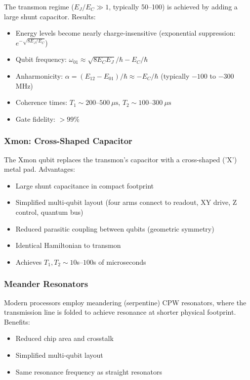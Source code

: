 \documentclass{article}
\begin{document}
The transmon regime ($E_J/E_C \gg 1$, typically 50--100) is achieved by adding a large shunt capacitor. Results:
\begin{itemize}
    \item Energy levels become nearly charge-insensitive (exponential suppression: $e^{-\sqrt{8E_J/E_C}}$)
    \item Qubit frequency: $\omega_{01} \approx \sqrt{8E_C E_J}/\hbar - E_C/\hbar$
    \item Anharmonicity: $\alpha = (E_{12} - E_{01})/\hbar \approx -E_C/\hbar$ (typically $-100$ to $-300$ MHz)
    \item Coherence times: $T_1 \sim 200$--$500~\mu\text{s}$, $T_2 \sim 100$--$300~\mu\text{s}$
    \item Gate fidelity: $> 99\%$
\end{itemize}

\subsubsection*{Xmon: Cross-Shaped Capacitor}

The Xmon qubit replaces the transmon's capacitor with a cross-shaped ('X') metal pad. Advantages:
\begin{itemize}
    \item Large shunt capacitance in compact footprint
    \item Simplified multi-qubit layout (four arms connect to readout, XY drive, Z control, quantum bus)
    \item Reduced parasitic coupling between qubits (geometric symmetry)
    \item Identical Hamiltonian to transmon
    \item Achieves $T_1, T_2 \sim 10$s--$100$s of microseconds
\end{itemize}

\subsubsection*{Meander Resonators}

Modern processors employ meandering (serpentine) CPW resonators, where the transmission line is folded to achieve resonance at shorter physical footprint. Benefits:
\begin{itemize}
    \item Reduced chip area and crosstalk
    \item Simplified multi-qubit layout
    \item Same resonance frequency as straight resonators
\end{itemize}
\end{document}
